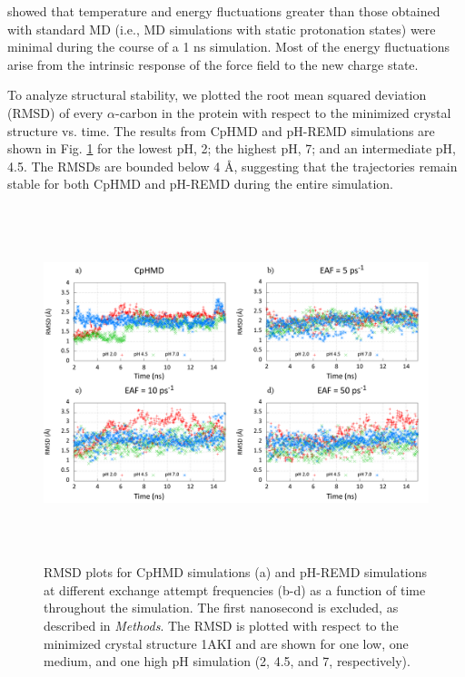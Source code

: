 \citeauthor{Mongan_JComputChem_2004_v25_p2038}
\cite{Mongan_JComputChem_2004_v25_p2038} showed that temperature and energy
fluctuations greater than those obtained with standard MD (i.e., MD simulations
with static protonation states) were minimal during the course of a 1 ns
simulation. Most of the energy fluctuations arise from the intrinsic response of
the force field to the new charge state.

To analyze structural stability, we plotted the root mean squared deviation
(RMSD) of every $\alpha$-carbon in the protein with respect to the minimized
crystal structure vs. time. The results from CpHMD and pH-REMD simulations are
shown in Fig. \ref{fig3:RMSD} for the lowest pH, 2; the highest pH, 7; and an
intermediate pH, 4.5. The RMSDs are bounded below 4 \AA, suggesting that the
trajectories remain stable for both CpHMD and pH-REMD during the entire
simulation.

\begin{figure}
 \includegraphics[width=6.5in, height=4.06in]{1AKI_RMSD_Comparison.png}
 \caption{RMSD plots for CpHMD simulations (a) and pH-REMD simulations at
          different exchange attempt frequencies (b-d) as a function of time
          throughout the simulation. The first nanosecond is excluded, as
          described in \emph{Methods}. The RMSD is plotted with respect to the
          minimized crystal structure 1AKI and are shown for one low, one
          medium, and one high pH simulation (2, 4.5, and 7, respectively).}
 \label{fig3:RMSD}
\end{figure}


